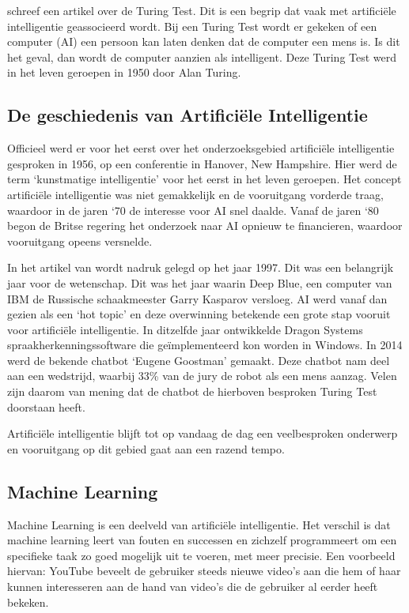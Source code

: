 \textcite{Kraaijvanger2012} schreef een artikel over de Turing Test. Dit is een begrip dat vaak met artificiële intelligentie geassocieerd wordt. Bij een Turing Test wordt er gekeken of een computer (AI) een persoon kan laten denken dat de computer een mens is. Is dit het geval, dan wordt de computer aanzien als intelligent. Deze Turing Test werd in het leven geroepen in 1950 door Alan Turing. 

\subsection{De geschiedenis van Artificiële Intelligentie}
\label{sec:artificiëleintelligentiegeschiedenis}

Officieel werd er voor het eerst over het onderzoeksgebied artificiële intelligentie gesproken in 1956, op een conferentie in Hanover, New Hampshire. Hier werd de term ‘kunstmatige intelligentie’ voor het eerst in het leven geroepen. Het concept artificiële intelligentie was niet gemakkelijk en de vooruitgang vorderde traag, waardoor in de jaren ‘70 de interesse voor AI snel daalde. Vanaf de jaren ‘80 begon de Britse regering het onderzoek naar AI opnieuw te financieren, waardoor vooruitgang opeens versnelde. \autocite{Anyoha2017}

In het artikel van \textcite{Anyoha2017} wordt nadruk gelegd op het jaar 1997. Dit was een belangrijk jaar voor de wetenschap. Dit was het jaar waarin Deep Blue, een computer van IBM de Russische schaakmeester Garry Kasparov versloeg. AI werd vanaf dan gezien als een ‘hot topic’ en deze overwinning betekende een grote stap vooruit voor artificiële intelligentie. In ditzelfde jaar ontwikkelde Dragon Systems spraakherkenningssoftware die geïmplementeerd kon worden in Windows. 
In 2014 werd de bekende chatbot ‘Eugene Goostman’ gemaakt. Deze chatbot nam deel aan een wedstrijd, waarbij 33\% van de jury de robot als een mens aanzag. Velen zijn daarom van mening dat de chatbot de hierboven besproken Turing Test doorstaan heeft. \autocite{Anyoha2017}
 
Artificiële intelligentie blijft tot op vandaag de dag een veelbesproken onderwerp en vooruitgang op dit gebied gaat aan een razend tempo. 

\subsection{Machine Learning}
\label{sec:machinelearning}
Machine Learning is een deelveld van artificiële intelligentie. Het verschil is dat machine learning leert van fouten en successen en zichzelf programmeert om een specifieke taak zo goed mogelijk uit te voeren, met meer precisie. Een voorbeeld hiervan: YouTube beveelt de gebruiker steeds nieuwe video’s aan die hem of haar kunnen interesseren aan de hand van video’s die de gebruiker al eerder heeft bekeken. \autocite{IBM2021}

